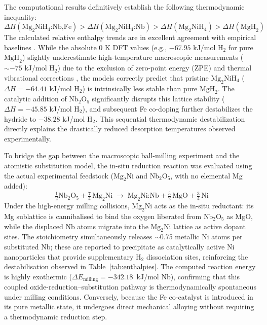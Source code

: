 \documentclass[12pt,a4paper]{article}
\begin{document}
The computational results definitively establish the following thermodynamic inequality:
\begin{equation}
    \Delta H(\text{Mg}_2\text{NiH}_4\text{:Nb,Fe}) > \Delta H(\text{Mg}_2\text{NiH}_4\text{:Nb}) > \Delta H(\text{Mg}_2\text{NiH}_4) > \Delta H(\text{MgH}_2)
\end{equation}
The calculated relative enthalpy trends are in excellent agreement with empirical baselines \cite{song2023recent, li2023core}. While the absolute 0 K DFT values (e.g., $-67.95$ kJ/mol $\text{H}_2$ for pure $\text{MgH}_2$) slightly underestimate high-temperature macroscopic measurements ($\sim -75$ kJ/mol $\text{H}_2$) due to the exclusion of zero-point energy (ZPE) and thermal vibrational corrections \cite{Wagemans2005}, the models correctly predict that pristine $\text{Mg}_2\text{NiH}_4$ ($\Delta H = -64.41$ kJ/mol $\text{H}_2$) is intrinsically less stable than pure $\text{MgH}_2$. The catalytic addition of $\text{Nb}_2\text{O}_5$ significantly disrupts this lattice stability ($\Delta H = -45.85$ kJ/mol $\text{H}_2$), and subsequent Fe co-doping further destabilizes the hydride to $-38.28$ kJ/mol $\text{H}_2$. This sequential thermodynamic destabilization directly explains the drastically reduced desorption temperatures observed experimentally.

To bridge the gap between the macroscopic ball-milling experiment and the atomistic substitution model, the in-situ reduction reaction was evaluated using the actual experimental feedstock ($\text{Mg}_2\text{Ni}$ and $\text{Nb}_2\text{O}_5$, with no elemental Mg added):
\begin{equation}
    \tfrac{1}{2}\text{Nb}_2\text{O}_5 + \tfrac{7}{4}\,\text{Mg}_2\text{Ni} \;\longrightarrow\; \text{Mg}_2\text{Ni:Nb} + \tfrac{5}{2}\,\text{MgO} + \tfrac{3}{4}\,\text{Ni}
\end{equation}
Under the high-energy milling collisions, $\text{Mg}_2\text{Ni}$ acts as the in-situ reductant: its Mg sublattice is cannibalised to bind the oxygen liberated from $\text{Nb}_2\text{O}_5$ as MgO, while the displaced Nb atoms migrate into the $\text{Mg}_2\text{Ni}$ lattice as active dopant sites. The stoichiometry simultaneously releases $\sim$0.75 metallic Ni atoms per substituted Nb; these are reported to precipitate as catalytically active Ni nanoparticles that provide supplementary $\text{H}_2$ dissociation sites, reinforcing the destabilisation observed in Table~\ref{tab:enthalpies}. The computed reaction energy is highly exothermic ($\Delta E_{\text{milling}} = -342.18$~kJ/mol Nb), confirming that this coupled oxide-reduction--substitution pathway is thermodynamically spontaneous under milling conditions. Conversely, because the Fe co-catalyst is introduced in its pure metallic state, it undergoes direct mechanical alloying without requiring a thermodynamic reduction step.
\end{document}
